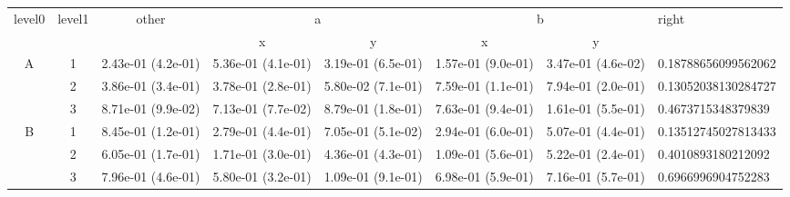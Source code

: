 \begin{tabular}{cccccccl}
\toprule
\multirow{2}{*}{level0} & \multirow{2}{*}{level1}& \multirow{2}{*}{other}&\multicolumn{2}{c}{a}&\multicolumn{2}{c}{b}& \multirow{2}{*}{right}\tabularnewline
\cmidrule(lr){4-5}
\cmidrule(lr){6-7}
&&&x&y&x&y\tabularnewline
\midrule
\multirow{3}{*}{A}&1& 2.43e-01 (4.2e-01)& 5.36e-01 (4.1e-01)& 3.19e-01 (6.5e-01)& 1.57e-01 (9.0e-01)& 3.47e-01 (4.6e-02)& 0.18788656099562062\tabularnewline
&2& 3.86e-01 (3.4e-01)& 3.78e-01 (2.8e-01)& 5.80e-02 (7.1e-01)& 7.59e-01 (1.1e-01)& 7.94e-01 (2.0e-01)& 0.13052038130284727\tabularnewline
&3& 8.71e-01 (9.9e-02)& 7.13e-01 (7.7e-02)& 8.79e-01 (1.8e-01)& 7.63e-01 (9.4e-01)& 1.61e-01 (5.5e-01)& 0.4673715348379839\tabularnewline
\midrule
\multirow{3}{*}{B}&1& 8.45e-01 (1.2e-01)& 2.79e-01 (4.4e-01)& 7.05e-01 (5.1e-02)& 2.94e-01 (6.0e-01)& 5.07e-01 (4.4e-01)& 0.13512745027813433\tabularnewline
&2& 6.05e-01 (1.7e-01)& 1.71e-01 (3.0e-01)& 4.36e-01 (4.3e-01)& 1.09e-01 (5.6e-01)& 5.22e-01 (2.4e-01)& 0.4010893180212092\tabularnewline
&3& 7.96e-01 (4.6e-01)& 5.80e-01 (3.2e-01)& 1.09e-01 (9.1e-01)& 6.98e-01 (5.9e-01)& 7.16e-01 (5.7e-01)& 0.6966996904752283\tabularnewline
\bottomrule
\end{tabular}
